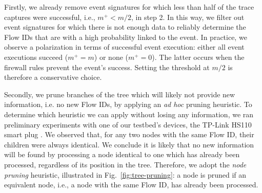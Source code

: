 Firstly, we already remove event signatures for which less than half of the trace captures were successful, i.e., $m^+ < m/2$, in step 2.
In this way, we filter out event signatures for which there is not enough data to reliably determine the Flow IDs that are with a high probability linked to the event. In practice, we observe a polarization in terms of successful event execution:
either all event executions succeed ($m^+=m$) or none ($m^+=0$).
The latter occurs when the firewall rules prevent the event's success.
Setting the threshold at $m/2$ is therefore a conservative choice.



Secondly, we prune branches of the tree
which will likely not provide new information,
i.e. no new Flow IDs,
by applying an \textit{ad hoc} pruning heuristic.
To determine which heuristic we can apply without losing any information,
we ran preliminary experiments with one of our testbed's devices,
the TP-Link HS110 smart plug \cite{hs110}.
We observed that, for any two nodes with the same Flow ID,
their children were always identical.
We conclude it is likely that no new information will be found
by processing a node identical to one which has already been processed,
regardless of its position in the tree.
Therefore, we adopt the \emph{node pruning} heuristic,
illustrated in Fig.~\ref{fig:tree-pruning}:
a node is pruned if an equivalent node, i.e., a node with the same Flow ID, has already been processed.





